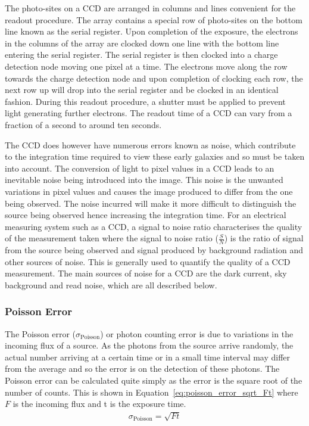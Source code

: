 		The photo-sites on a CCD are arranged in columns and lines convenient for the readout procedure. The array contains a special row of photo-sites on the bottom line known as the serial register. Upon completion of the exposure, the electrons in the columns of the array are clocked down one line with the bottom line entering the serial register. The serial register is then clocked into a charge detection node moving one pixel at a time. The electrons move along the row towards the charge detection node and upon completion of clocking each row, the next row up will drop into the serial register and be clocked in an identical fashion\cite{Astronomical_Image_Processing}. During this readout procedure, a shutter must be applied to prevent light generating further electrons. The readout time of a CCD can vary from a fraction of a second to around ten seconds.

		The CCD does however have numerous errors known as noise, which contribute to the integration time required to view these early galaxies and so must be taken into account. The conversion of light to pixel values in a CCD leads to an inevitable noise being introduced into the image. This noise is the unwanted variations in pixel values and causes the image produced to differ from the one being observed. The noise incurred will make it more difficult to distinguish the source being observed hence increasing the integration time. For an electrical measuring system such as a CCD, a signal to noise ratio characterises the quality of the measurement taken where the signal to noise ratio ($\frac{S}{N}$) is the ratio of signal from the source being observed and signal produced by background radiation and other sources of noise. This is generally used to quantify the quality of a CCD measurement. The main sources of noise for a CCD are the dark current, sky background and read noise, which are all described below.

		\subsubsection{Poisson Error} %
		\label{ssub:poisson_error}
			The Poisson error ($\sigma_\text{Poisson}$) or photon counting error is due to variations in the incoming flux of a source. As the photons from the source arrive randomly, the actual number arriving at a certain time or in a small time interval may differ from the average and so the error is on the detection of these photons. The Poisson error can be calculated quite simply as the error is the square root of the number of counts. This is shown in Equation~\ref{eq:poisson_error_sqrt_Ft} where $F$ is the incoming flux and t is the exposure time.
			\begin{align}
				\sigma_\text{Poisson} = \sqrt{Ft} \label{eq:poisson_error_sqrt_Ft}
			\end{align}

